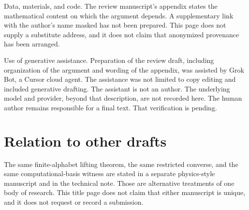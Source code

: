 \documentclass[11pt]{article}
\begin{document}
Data, materials, and code. The review manuscript's appendix states the mathematical content on which the argument depends. A supplementary link with the author's name masked has not been prepared. This page does not supply a substitute address, and it does not claim that anonymized provenance has been arranged.

Use of generative assistance. Preparation of the review draft, including organization of the argument and wording of the appendix, was assisted by Grok Bot, a Cursor cloud agent. The assistance was not limited to copy editing and included generative drafting. The assistant is not an author. The underlying model and provider, beyond that description, are not recorded here. The human author remains responsible for a final text. That verification is pending.

\section*{Relation to other drafts}
The same finite-alphabet lifting theorem, the same restricted converse, and the same computational-basis witness are stated in a separate physics-style manuscript and in the technical note. Those are alternative treatments of one body of research. This title page does not claim that either manuscript is unique, and it does not request or record a submission.
\end{document}
